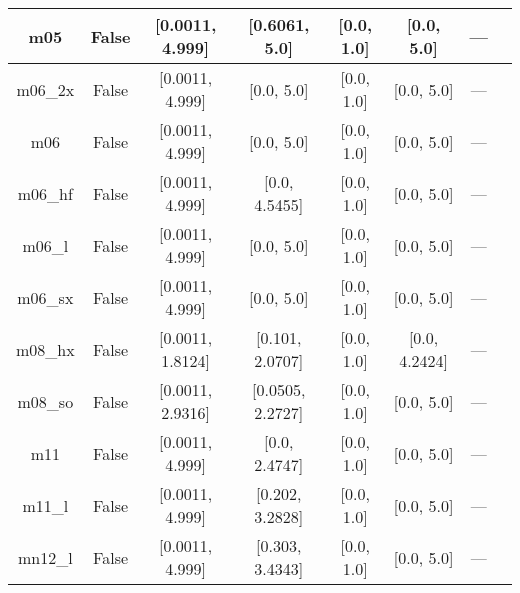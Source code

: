 \begin{tabular}{|c|c|c|c|c|c|c|l|}
          m05 &                 False &  [0.0011, 4.999] &    [0.6061, 5.0] &    [0.0, 1.0] &     [0.0, 5.0] &        --- &                                                             \cite{Zhao2005_161103} \\ \hline
      m06\_2x &                 False &  [0.0011, 4.999] &       [0.0, 5.0] &    [0.0, 1.0] &     [0.0, 5.0] &        --- &                                                                \cite{Zhao2008_215} \\ \hline
          m06 &                 False &  [0.0011, 4.999] &       [0.0, 5.0] &    [0.0, 1.0] &     [0.0, 5.0] &        --- &                                                                \cite{Zhao2008_215} \\ \hline
      m06\_hf &                 False &  [0.0011, 4.999] &    [0.0, 4.5455] &    [0.0, 1.0] &     [0.0, 5.0] &        --- &                                                              \cite{Zhao2006_13126} \\ \hline
       m06\_l &                 False &  [0.0011, 4.999] &       [0.0, 5.0] &    [0.0, 1.0] &     [0.0, 5.0] &        --- &                                                \cite{Zhao2006_194101,Zhao2008_215} \\ \hline
      m06\_sx &                 False &  [0.0011, 4.999] &       [0.0, 5.0] &    [0.0, 1.0] &     [0.0, 5.0] &        --- &                                                               \cite{Wang2020_2294} \\ \hline
      m08\_hx &                 False & [0.0011, 1.8124] &  [0.101, 2.0707] &    [0.0, 1.0] &  [0.0, 4.2424] &        --- &                                                               \cite{Zhao2008_1849} \\ \hline
      m08\_so &                 False & [0.0011, 2.9316] & [0.0505, 2.2727] &    [0.0, 1.0] &     [0.0, 5.0] &        --- &                                                               \cite{Zhao2008_1849} \\ \hline
          m11 &                 False &  [0.0011, 4.999] &    [0.0, 2.4747] &    [0.0, 1.0] &     [0.0, 5.0] &        --- &                                                           \cite{Peverati2011_2810} \\ \hline
       m11\_l &                 False &  [0.0011, 4.999] &  [0.202, 3.2828] &    [0.0, 1.0] &     [0.0, 5.0] &        --- &                                                            \cite{Peverati2012_117} \\ \hline
      mn12\_l &                 False &  [0.0011, 4.999] &  [0.303, 3.4343] &    [0.0, 1.0] &     [0.0, 5.0] &        --- &                                                          \cite{Peverati2012_13171} \\ \hline

\end{tabular}
